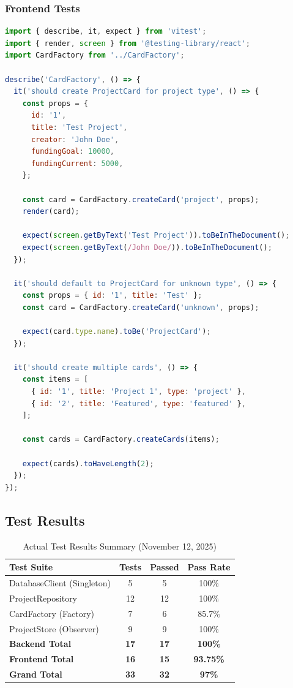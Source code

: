 \documentclass[12pt,a4paper]{article}
\begin{document}
\subsubsection{Frontend Tests}
\begin{lstlisting}[language=JavaScript, caption=CardFactory.test.tsx]
import { describe, it, expect } from 'vitest';
import { render, screen } from '@testing-library/react';
import CardFactory from '../CardFactory';

describe('CardFactory', () => {
  it('should create ProjectCard for project type', () => {
    const props = {
      id: '1',
      title: 'Test Project',
      creator: 'John Doe',
      fundingGoal: 10000,
      fundingCurrent: 5000,
    };

    const card = CardFactory.createCard('project', props);
    render(card);

    expect(screen.getByText('Test Project')).toBeInTheDocument();
    expect(screen.getByText(/John Doe/)).toBeInTheDocument();
  });

  it('should default to ProjectCard for unknown type', () => {
    const props = { id: '1', title: 'Test' };
    const card = CardFactory.createCard('unknown', props);

    expect(card.type.name).toBe('ProjectCard');
  });

  it('should create multiple cards', () => {
    const items = [
      { id: '1', title: 'Project 1', type: 'project' },
      { id: '2', title: 'Featured', type: 'featured' },
    ];

    const cards = CardFactory.createCards(items);

    expect(cards).toHaveLength(2);
  });
});
\end{lstlisting}

\subsection{Test Results}

\begin{table}[H]
\centering
\begin{tabular}{|l|c|c|c|}
\hline
\textbf{Test Suite} & \textbf{Tests} & \textbf{Passed} & \textbf{Pass Rate} \\
\hline
DatabaseClient (Singleton) & 5 & 5 & 100\% \\
ProjectRepository & 12 & 12 & 100\% \\
CardFactory (Factory) & 7 & 6 & 85.7\% \\
ProjectStore (Observer) & 9 & 9 & 100\% \\
\hline
\textbf{Backend Total} & \textbf{17} & \textbf{17} & \textbf{100\%} \\
\textbf{Frontend Total} & \textbf{16} & \textbf{15} & \textbf{93.75\%} \\
\hline
\textbf{Grand Total} & \textbf{33} & \textbf{32} & \textbf{97\%} \\
\hline
\end{tabular}
\caption{Actual Test Results Summary (November 12, 2025)}
\end{table}
\end{document}

